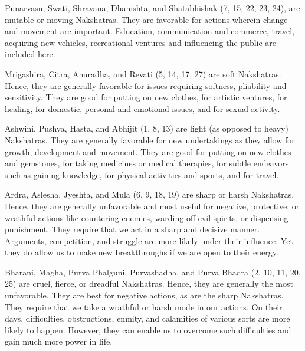  


Punarvasu, Swati, Shravana, Dhanishta, and Shatabhishak (7, 15, 22, 23, 24), are mutable or moving Nakshatras. They are favorable for actions wherein change and movement are important. Education, communication and commerce, travel, acquiring new vehicles, recreational ventures and influencing the public are included here.

 


Mrigashira, Citra, Anuradha, and Revati (5, 14, 17, 27) are soft Nakshatras. Hence, they are generally favorable for issues requiring softness, pliability and sensitivity. They are good for putting on new clothes, for artistic ventures, for healing, for domestic, personal and emotional issues, and for sexual activity.

 


Ashwini, Pushya, Hasta, and Abhijit (1, 8, 13) are light (as opposed to heavy) Nakshatras. They are generally favorable for new undertakings as they allow for growth, development and movement. They are good for putting on new clothes and gemstones, for taking medicines or medical therapies, for subtle endeavors such as gaining knowledge, for physical activities and sports, and for travel.

 


Ardra, Aslesha, Jyeshta, and Mula (6, 9, 18, 19) are sharp or harsh Nakshatras. Hence, they are generally unfavorable and most useful for negative, protective, or wrathful actions like countering enemies, warding off evil spirits, or dispensing punishment. They require that we act in a sharp and decisive manner. Arguments, competition, and struggle are more likely under their influence. Yet they do allow us to make new breakthroughs if we are open to their energy.

 


Bharani, Magha, Purva Phalguni, Purvashadha, and Purva Bhadra (2, 10, 11, 20, 25) are cruel, fierce, or dreadful Nakshatras. Hence, they are generally the most unfavorable. They are best for negative actions, as are the sharp Nakshatras. They require that we take a wrathful or harsh mode in our actions. On their days, difficulties, obstructions, enmity, and calamities of various sorts are more likely to happen. However, they can enable us to overcome such difficulties and gain much more power in life.


